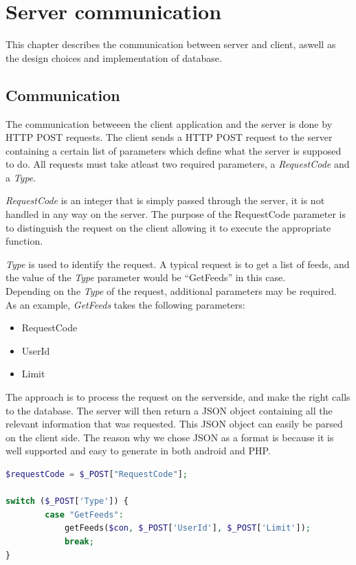 \chapter{Server communication}
This chapter describes the communication between server and client, aswell as the design choices and
implementation of database. 

\section{Communication}
\label{sec:com}

The communication betweeen the client application and the server is done by HTTP POST requests.
The client sends a HTTP POST request to the server containing a certain list of parameters which
define what the server is supposed to do. All requests must take atleast two required parameters, a \textit{RequestCode} and a
\textit{Type}.

\textit{RequestCode} is an integer that is simply passed through the server, it is not handled in any
way on the server. The purpose of the RequestCode parameter is to distinguish the request on the client allowing
it to execute the appropriate function.

\textit{Type} is used to identify the request. A typical request is to get a list of feeds, and the
value of the \textit{Type} parameter would be ``GetFeeds'' in this case.\\

Depending on the \textit{Type} of the request, additional parameters may be required.\\

As an example, \textit{GetFeeds} takes the following parameters:
\begin{itemize}
\item RequestCode
\item UserId
\item Limit
\end{itemize}

The approach is to process the request on the serverside, and make the right calls to the
database. The server will then return a JSON object containing all the relevant information that was
requested. This JSON object can easily be parsed on the client side. The reason why we chose JSON as
a format is because it is well supported and easy to generate in both android and PHP.

\begin{lstlisting}[language=php, caption=getFeeds function call]
$requestCode = $_POST["RequestCode"];

switch ($_POST['Type']) {
        case "GetFeeds":
            getFeeds($con, $_POST['UserId'], $_POST['Limit']);
            break;
}
\end{lstlisting}

